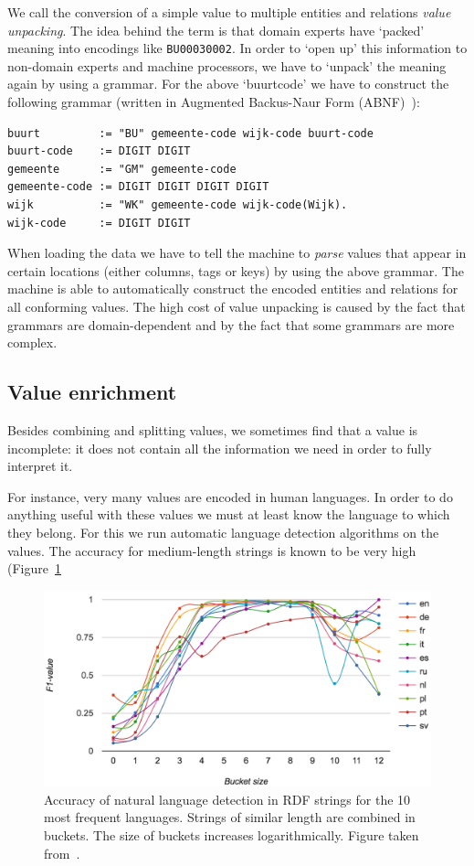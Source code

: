 \documentclass[a4paper]{scrartcl}
\begin{document}
We call the conversion of a simple value to multiple entities and
relations \emph{value unpacking}.  The idea behind the term is that
domain experts have `packed' meaning into encodings like
\texttt{BU00030002}.  In order to `open up' this information to
non-domain experts and machine processors, we have to `unpack' the
meaning again by using a grammar.  For the above `buurtcode' we have
to construct the following grammar (written in Augmented Backus-Naur
Form (ABNF)~\cite{Crocker2008}):

\begin{verbatim}
buurt         := "BU" gemeente-code wijk-code buurt-code
buurt-code    := DIGIT DIGIT
gemeente      := "GM" gemeente-code
gemeente-code := DIGIT DIGIT DIGIT DIGIT
wijk          := "WK" gemeente-code wijk-code(Wijk).
wijk-code     := DIGIT DIGIT
\end{verbatim}

When loading the data we have to tell the machine to \emph{parse}
values that appear in certain locations (either columns, tags or keys)
by using the above grammar.  The machine is able to automatically
construct the encoded entities and relations for all conforming
values.  The high cost of value unpacking is caused by the fact that
grammars are domain-dependent and by the fact that some grammars are
more complex.


\subsection{Value enrichment}
\label{sec:value_enrichment}

Besides combining and splitting values, we sometimes find that a value
is incomplete: it does not contain all the information we need in
order to fully interpret it.

For instance, very many values are encoded in human languages.  In
order to do anything useful with these values we must at least know
the language to which they belong.  For this we run automatic language
detection algorithms on the values.  The accuracy for medium-length
strings is known to be very high (Figure~\ref{fig:natlang}

\begin{figure}
  \includegraphics[width=\linewidth]{img/natlang.png}
  \caption{Accuracy of natural language detection in RDF strings for
    the 10 most frequent languages.  Strings of similar length are
    combined in buckets.  The size of buckets increases
    logarithmically.  Figure taken from~\cite{Beek2016c}.}
  \label{fig:natlang}
\end{figure}
\end{document}
